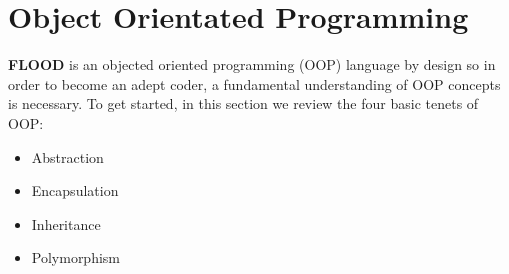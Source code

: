 \documentclass[12pt]{report}
\begin{document}
\section{Object Orientated Programming}

\begin{doublespace}
\end{doublespace}

\begin{doublespace}
\textbf{FLOOD} is an objected oriented programming (OOP) language by design so in order to become an adept coder, a fundamental understanding of OOP concepts is necessary. To get started, in this section we review the four basic tenets of OOP:
\begin{itemize}
\setlength{\itemsep}{1pt}
\item Abstraction
\item Encapsulation
\item Inheritance
\item Polymorphism
\end{itemize}
\end{doublespace}
\end{document}
